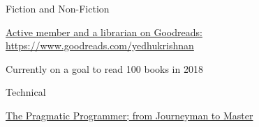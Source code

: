 \begin{cventries}
  \cventry
    {Fiction and Non-Fiction}
    {}
    {}
    {}
    {
      \begin{cvitems}
        \item {\href{https://www.goodreads.com/yedhukrishnan}{Active member and a librarian on Goodreads: https://www.goodreads.com/yedhukrishnan}}
        \item {Currently on a goal to read 100 books in 2018}
      \end{cvitems}
    }
  \cventry
    {Technical}
    {}
    {}
    {}
    {
      \begin{cvitems}
        \item {\href{https://www.goodreads.com/book/show/4099.The_Pragmatic_Programmer}{The Pragmatic Programmer; from Journeyman to Master}}
      \end{cvitems}
    }
\end{cventries}
